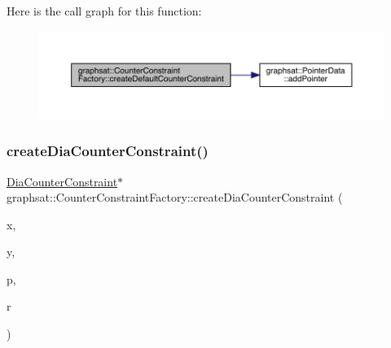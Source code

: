 Here is the call graph for this function\+:\nopagebreak
\begin{figure}[H]
\begin{center}
\leavevmode
\includegraphics[width=350pt]{classgraphsat_1_1_counter_constraint_factory_ab9159fe75e5f66be295919d7e4e8424c_cgraph}
\end{center}
\end{figure}
\mbox{\label{classgraphsat_1_1_counter_constraint_factory_ade0ff0c1aca8de0e07be8fc7f0694996}} 
\subsubsection{\texorpdfstring{createDiaCounterConstraint()}{createDiaCounterConstraint()}}
{\footnotesize\ttfamily \mbox{\hyperlink{classgraphsat_1_1_dia_counter_constraint}{Dia\+Counter\+Constraint}}$\ast$ graphsat\+::\+Counter\+Constraint\+Factory\+::create\+Dia\+Counter\+Constraint (\begin{DoxyParamCaption}\item[{int}]{x,  }\item[{int}]{y,  }\item[{\mbox{\hyperlink{namespacegraphsat_acfb5939f9bdafbd9aea0d084b9a56f69}{C\+O\+M\+P\+\_\+\+O\+P\+E\+R\+A\+T\+OR}}}]{p,  }\item[{int}]{r }\end{DoxyParamCaption})\hspace{0.3cm}{\ttfamily [inline]}}

